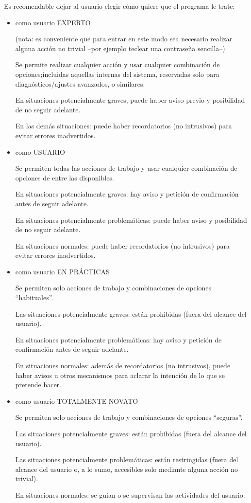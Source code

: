 \documentclass[spanish,12pt,a4paper,final,oneside]{book}
\begin{document}
Es recomendable dejar al usuario elegir cómo quiere que el programa le trate:
\begin{itemize}

\item como usuario EXPERTO

(nota: es conveniente que para entrar en este modo sea necesario realizar alguna acción no trivial --por ejemplo teclear una contraseña sencilla--)

Se permite realizar cualquier acción y usar cualquier combinación de opciones;incluidas aquellas internas del sistema, reservadas solo para diagnósticos/ajustes avanzados, o similares.

En situaciones potencialmente graves, puede haber aviso previo y posibilidad de no seguir adelante.

En las demás situaciones: puede haber recordatorios (no intrusivos) para evitar errores inadvertidos.

\item como USUARIO

Se permiten todas las acciones de trabajo y usar cualquier combinación de opciones de entre las disponibles.

En situaciones potencialmente graves: hay aviso y petición de confirmación antes de seguir adelante.

En situaciones potencialmente problemáticas: puede haber aviso y posibilidad de no seguir adelante.

En situaciones normales: puede haber recordatorios (no intrusivos) para evitar errores inadvertidos.

\item como usuario EN PRÁCTICAS

Se permiten solo acciones de trabajo y combinaciones de opciones ``habituales''.

Las situaciones potencialmente graves: están prohibidas (fuera del alcance del usuario).

En situaciones potencialmente problemáticas: hay aviso y petición de confirmación antes de seguir adelante.

En situaciones normales: además de recordatorios (no intrusivos), puede haber avisos u otros mecanismos para aclarar la intención de lo que se pretende hacer.

\item como usuario TOTALMENTE NOVATO

Se permiten solo acciones de trabajo y combinaciones de opciones ``seguras''.

Las situaciones potencialmente graves: están prohibidas (fuera del alcance del usuario).

Las situaciones potencialmente problemáticas: están restringidas (fuera del alcance del usuario o, a lo sumo, accesibles solo mediante alguna acción no trivial).

En situaciones normales: se guian o se supervisan las actividades del usuario.

\end{itemize}
\end{document}
